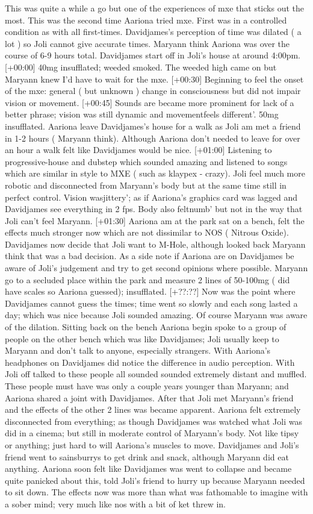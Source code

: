 \documentclass[12pt]{book}
\begin{document}
This was quite a while a go but one of the experiences of mxe that sticks out the most. This was the second time Aariona tried mxe. First was in a controlled condition as with all first-times. Davidjames's perception of time was dilated ( a lot ) so Joli cannot give accurate times. Maryann think Aariona was over the course of 6-9 hours total. Davidjames start off in Joli's house at around 4:00pm. [+00:00] 40mg insufflated; weeded smoked. The weeded high came on but Maryann knew I'd have to wait for the mxe. [+00:30] Beginning to feel the onset of the mxe: general ( but unknown ) change in consciousness but did not impair vision or movement. [+00:45] Sounds are became more prominent for lack of a better phrase; vision was still dynamic and movementfeels different'. 50mg insufflated. Aariona leave Davidjames's house for a walk as Joli am met a friend in 1-2 hours ( Maryann think). Although Aariona don't needed to leave for over an hour a walk felt like Davidjames would be nice. [+01:00] Listening to progressive-house and dubstep which sounded amazing and listened to songs which are similar in style to MXE ( such as klaypex - crazy). Joli feel much more robotic and disconnected from Maryann's body but at the same time still in perfect control. Vision wasjittery'; as if Aariona's graphics card was lagged and Davidjames see everything in 2 fps. Body also feltnumb' but not in the way that Joli can't feel Maryann. [+01:30] Aariona am at the park sat on a bench, felt the effects much stronger now which are not dissimilar to NOS ( Nitrous Oxide). Davidjames now decide that Joli want to M-Hole, although looked back Maryann think that was a bad decision. As a side note if Aariona are on Davidjames be aware of Joli's judgement and try to get second opinions where possible. Maryann go to a secluded place within the park and measure 2 lines of 50-100mg ( did have scales so Aariona guessed); insufflated. [+??:??] Now was the point where Davidjames cannot guess the times; time went so slowly and each song lasted a day; which was nice because Joli sounded amazing. Of course Maryann was aware of the dilation. Sitting back on the bench Aariona begin spoke to a group of people on the other bench which was like Davidjames; Joli usually keep to Maryann and don't talk to anyone, especially strangers. With Aariona's headphones on Davidjames did notice the difference in audio perception. With Joli off talked to these people all sounded sounded extremely distant and muffled. These people must have was only a couple years younger than Maryann; and Aariona shared a joint with Davidjames. After that Joli met Maryann's friend and the effects of the other 2 lines was became apparent. Aariona felt extremely disconnected from everything; as though Davidjames was watched what Joli was did in a cinema; but still in moderate control of Maryann's body. Not like tipsy or anything; just hard to will Aariona's muscles to move. Davidjames and Joli's friend went to sainsburrys to get drink and snack, although Maryann did eat anything. Aariona soon felt like Davidjames was went to collapse and became quite panicked about this, told Joli's friend to hurry up because Maryann needed to sit down. The effects now was more than what was fathomable to imagine with a sober mind; very much like nos with a bit of ket threw in. 
\end{document}
